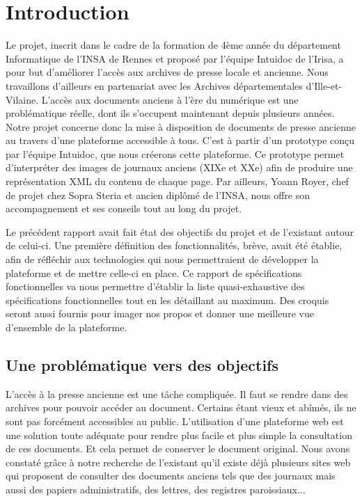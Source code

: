 \section{Introduction}
\label{sec:intro}

Le projet, inscrit dans le cadre de la formation de 4ème année du département Informatique de l’INSA de Rennes et proposé par l’équipe Intuidoc de l’Irisa, a pour but d’améliorer l’accès aux archives de presse locale et ancienne. Nous travaillons d'ailleurs en partenariat avec les Archives départementales d'Ille-et-Vilaine. L'accès aux documents anciens à l'ère du numérique est une problématique réelle, dont ils s'occupent maintenant depuis plusieurs années. Notre projet concerne donc la mise à disposition de documents de presse ancienne au travers d'une plateforme accessible à tous. C'est à partir d'un prototype conçu par l'équipe Intuidoc, que nous créerons cette plateforme. Ce prototype permet d'interpréter des images de journaux anciens (XIXe et XXe) afin de produire une représentation XML du contenu de chaque page. Par ailleurs, Yoann Royer, chef de projet chez Sopra Steria et ancien diplômé de l'INSA, nous offre son accompagnement et ses conseils tout au long du projet.

Le précédent rapport avait fait état des objectifs du projet et de l'existant autour de celui-ci. Une première définition des fonctionnalités, brève, avait été établie, afin de réfléchir aux technologies qui nous permettraient de développer la plateforme et de mettre celle-ci en place. Ce rapport de spécifications fonctionnelles va nous permettre d'établir la liste quasi-exhaustive des spécifications fonctionnelles tout en les détaillant au maximum. Des croquis seront aussi fournis pour imager nos propos et donner une meilleure vue d'ensemble de la plateforme.

    \subsection{Une problématique vers des objectifs}
		\label{sec:probleme}
		
		L'accès à la presse ancienne est une tâche compliquée. Il faut se rendre dans des archives pour pouvoir accéder au document. Certains étant vieux et abîmés, ils ne sont pas forcément accessibles au public. L'utilisation d'une plateforme web est une solution toute adéquate pour rendre plus facile et plus simple la consultation de ces documents. Et cela permet de conserver le document original. Nous avons constaté grâce à notre recherche de l'existant qu'il existe déjà plusieurs sites web qui proposent de consulter des documents anciens tels que des journaux mais aussi des papiers administratifs, des lettres, des registres paroissiaux... 
		
